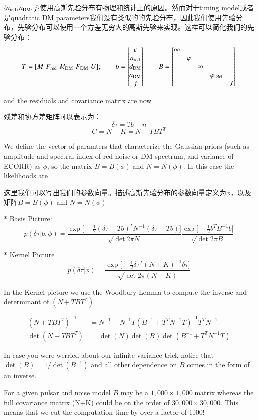 $\{ a_{\rm red}, a_{\rm DM}, j \}$使用高斯先验分布有物理和统计上的原因。然而对于timing model或者是quadratic DM parameters我们没有类似的的先验分布，因此我们使用先验分布，先验分布可以使用一个方差无穷大的高斯先验来实现。这样可以简化我们的先验分布：
$$
T = [M\,\, F_{\rm red}\,\, M_{\rm DM}\,\, F_{\rm DM}\,\, U];
\quad\quad b = \begin{bmatrix} \epsilon \\ a_{\rm red} \\ d_{\rm DM} \\ a_{\rm DM} \\ j\end{bmatrix}
\quad \quad B = 
\begin{bmatrix}  
\infty & & & &\\
& \varphi & & & \\
& & \infty & & \\
& & & \varphi_{\rm DM} \\
& & & & J
\end{bmatrix}
$$

and the residuals and covariance matrix are now

残差和协方差矩阵可以表示为：
$$\delta\tau = Tb + n$$
$$C = N + K = N + TBT^T$$

We define the vector of paramters that characterize the Gaussian priors (such as amplitude and spectral index of red noise or DM spectrum, and variance of ECORR) as $\phi$, so the matrix $B=B(\phi)$ and $N=N(\phi)$. In this case the likelihoods are

这里我们可以写出我们的参数向量。描述高斯先验分布的参数向量定义为$\phi$，以及矩阵$B=B(\phi)$ and $N=N(\phi)$

* Basis Picture:
$$ p(\delta\tau|b,\phi) = \frac{\exp{\bigg[-\frac{1}{2}(\delta\tau-Tb)^TN^{-1}(\delta\tau-Tb)\bigg]}}{\sqrt{ \det{2\pi N}}}\frac{\exp{\bigg[-\frac{1}{2}b^TB^{-1}b\bigg]}}{\sqrt{\det{2\pi B}}}$$

* Kernel Picture
$$p(\delta\tau|\phi)=\frac{\exp{\bigg[-\frac{1}{2}\delta\tau^T\left(N+K\right)^{-1}\delta\tau\bigg]}}{\sqrt{\det{2\pi(N+K)}}} $$

In the Kernel picture we use the Woodbury Lemma to compute the inverse and determinant of $(N+TBT^T)$


\begin{equation}
	\begin{aligned}
	(N+TBT^T)^{-1} &= N^{-1} - N^{-1}T\left(B^{-1}+T^TN^{-1}T \right)^{-1}T^TN^{-1} \\
	\det{(N+TBT^T)} &= \det{(N)}\det{(B)}\det{(B^{-1}+T^TN^{-1}T)}
	\end{aligned}
\end{equation}


In case you were worried about our infinite variance trick notice that $\det{(B)} = 1/\det{(B^{-1})}$ and all other dependence on $B$ comes in the form of an inverse.

For a given pulsar and noise model $B$ may be a $1,000\times1,000$ matrix whereas the full covariance matrix (N+K) could be on the order of $30,000\times30,000$. This means that we cut the computation time by over a factor of 1000!

